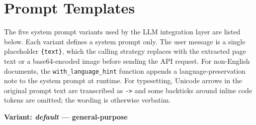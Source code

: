 \section{Prompt Templates}
\label{sec:prompt_templates}

The five system prompt variants used by the LLM integration layer are listed
below. Each variant defines a system prompt only. The user message is a single
placeholder \texttt{\{text\}}, which the calling strategy replaces with the
extracted page text or a base64-encoded image before sending the API request.
For non-English documents, the \texttt{with\_language\_hint} function appends
a language-preservation note to the system prompt at runtime. For
typesetting, Unicode arrows in the original prompt text are transcribed
as \texttt{->} and some backticks around inline code tokens are omitted;
the wording is otherwise verbatim.

\medskip\noindent\textbf{Variant: \textit{default} --- general-purpose}

